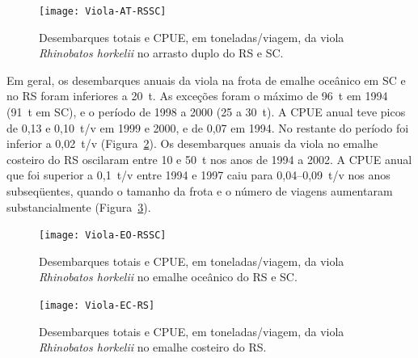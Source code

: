 \documentclass[a4paper,11pt,twoside,showtrims,onecolumn,openright,final]{memoir}
\begin{document}
%
%

\begin{figure}
\begin{center}
\texttt{[image: Viola-AT-RSSC]}
\end{center}
\caption[Desembarques totais e CPUE da viola no arrasto duplo do RS e SC.]
        {Desembarques totais e CPUE, em toneladas/viagem, da viola \emph{Rhinobatos horkelii} 
         no arrasto duplo do RS e SC.}
\label{fig:tangone-viola}
\end{figure}


Em geral, os desembarques anuais da viola na frota de emalhe oceânico em SC e no RS foram 
inferiores a 20~t. As exceções foram o máximo de 96~t em 1994 (91~t em SC), e o período de 1998 
a 2000 (25 a 30~t). A CPUE anual teve picos de 0,13 e 0,10~t/v em 1999 e 2000, e de 0,07 em 1994. 
No restante do período foi inferior a 0,02~t/v (Figura~\ref{fig:emalheoceanico-viola}). %
Os desembarques anuais da viola no emalhe costeiro do RS oscilaram 
entre 10 e 50~t nos anos de 1994 a 2002. A CPUE anual que foi 
superior a 0,1~t/v entre 1994 e 1997 caiu para 0,04--0,09~t/v nos anos subseqüentes, quando o 
tamanho da frota e o número de viagens aumentaram 
substancialmente (Figura~\ref{fig:emalhecosteiro-viola}). %

%
%

\begin{figure}
\begin{center}
\texttt{[image: Viola-EO-RSSC]}
\end{center}
\caption[Desembarques totais e CPUE da viola no emalhe oceânico do RS e SC.]
        {Desembarques totais e CPUE, em toneladas/viagem, da viola \emph{Rhinobatos horkelii} 
         no emalhe oceânico do RS e SC.}
\label{fig:emalheoceanico-viola}
\end{figure}


%
%

\begin{figure}
\begin{center}
\texttt{[image: Viola-EC-RS]}
\end{center}
\caption[Desembarques totais e CPUE da viola no emalhe costeiro do RS.]
        {Desembarques totais e CPUE, em toneladas/viagem, da viola \emph{Rhinobatos horkelii} 
         no emalhe costeiro do RS.}
\label{fig:emalhecosteiro-viola}
\end{figure}
\end{document}
